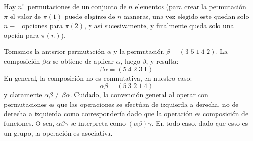   Hay \(n!\)~permutaciones
  de un conjunto de \(n\) elementos%
  (para crear la permutación \(\pi\)
   el valor de \(\pi(1)\) puede elegirse de \(n\) maneras,
   una vez elegido este
   quedan solo \(n - 1\) opciones para \(\pi(2)\),
   y así sucesivamente,
   y finalmente queda solo una opción para \(\pi(n)\)).

  Tomemos la anterior permutación \(\alpha\)
  y la permutación \(\beta = (3\;5\;1\;4\;2)\).
  La composición \(\beta \alpha\) se obtiene de aplicar \(\alpha\),
  luego \(\beta\),
  y resulta:
  \begin{equation*}
    \beta \alpha
      = (5\;4\;2\;3\;1)
  \end{equation*}
  En general,
  la composición no es conmutativa,
  en nuestro caso:
  \begin{equation*}
    \alpha \beta
      = (5\;3\;2\;1\;4)
  \end{equation*}
  y claramente \(\alpha \beta \ne \beta \alpha\).
  Cuidado,
  la convención general
  al operar con permutaciones es que las operaciones
  se efectúan de izquierda a derecha,
  no de derecha a izquierda como correspondería
  dado que la operación es composición de funciones.
  O sea,
  \(\alpha \beta \gamma\)
  se interpreta como \((\alpha \beta) \gamma\).
  En todo caso,
  dado que esto es un grupo,
  la operación es asociativa.%

